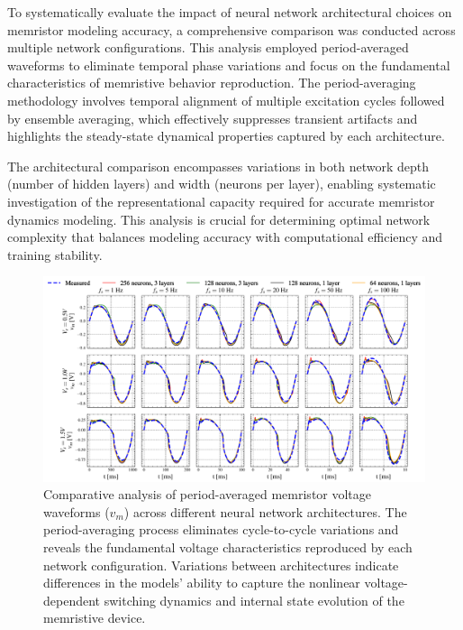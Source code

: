 \documentclass[11pt, oneside]{article}
\begin{document}
To systematically evaluate the impact of neural network architectural choices on memristor modeling accuracy, a comprehensive comparison was conducted across multiple network configurations. This analysis employed period-averaged waveforms to eliminate temporal phase variations and focus on the fundamental characteristics of memristive behavior reproduction. The period-averaging methodology involves temporal alignment of multiple excitation cycles followed by ensemble averaging, which effectively suppresses transient artifacts and highlights the steady-state dynamical properties captured by each architecture.

The architectural comparison encompasses variations in both network depth (number of hidden layers) and width (neurons per layer), enabling systematic investigation of the representational capacity required for accurate memristor dynamics modeling. This analysis is crucial for determining optimal network complexity that balances modeling accuracy with computational efficiency and training stability.

\begin{figure}[htbp!]
    \centering
    \includegraphics[width=\linewidth]{sample_results/simulated_vms.pdf}
    \caption{Comparative analysis of period-averaged memristor voltage waveforms ($v_m$) across different neural network architectures. The period-averaging process eliminates cycle-to-cycle variations and reveals the fundamental voltage characteristics reproduced by each network configuration. Variations between architectures indicate differences in the models' ability to capture the nonlinear voltage-dependent switching dynamics and internal state evolution of the memristive device.}
\end{figure}
\end{document}
